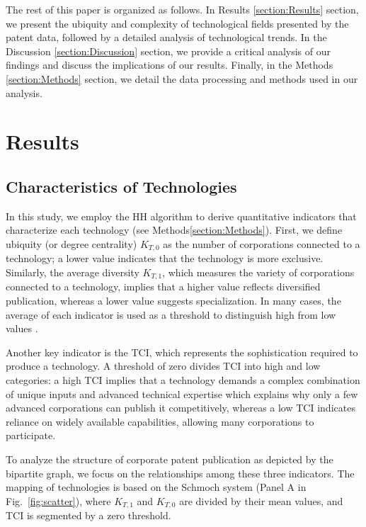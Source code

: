 \documentclass[fleqn,10pt]{wlscirep}
\begin{document}
The rest of this paper is organized as follows. 
In Results \ref{section:Results} section, we present the ubiquity and complexity of technological fields presented by the patent data, followed by a detailed analysis of technological trends.
In the Discussion \ref{section:Discussion} section, we provide a critical analysis of our findings and discuss the implications of our results.
Finally, in the Methods \ref{section:Methods} section, we detail the data processing and methods used in our analysis.


\section*{Results} \label{section:Results}

\subsection*{Characteristics of Technologies} \label{subsection:characteristics}
In this study, we employ the HH algorithm to derive quantitative indicators that characterize each technology (see Methods\ref{section:Methods}). First, we define ubiquity (or degree centrality) $K_{T,0}$ as the number of corporations connected to a technology; a lower value indicates that the technology is more exclusive. Similarly, the average diversity $K_{T,1}$, which measures the variety of corporations connected to a technology, implies that a higher value reflects diversified publication, whereas a lower value suggests specialization. In many cases, the average of each indicator is used as a threshold to distinguish high from low values \cite{Hidalgo2009,balland2017tci}.

Another key indicator is the TCI, which represents the sophistication required to produce a technology. A threshold of zero divides TCI into high and low categories: a high TCI implies that a technology demands a complex combination of unique inputs and advanced technical expertise which explains why only a few advanced corporations can publish it competitively, whereas a low TCI indicates reliance on widely available capabilities, allowing many corporations to participate.

To analyze the structure of corporate patent publication as depicted by the bipartite graph, we focus on the relationships among these three indicators. The mapping of technologies is based on the Schmoch system \cite{Schmoch2008} (Panel A in Fig.~\ref{fig:scatter}), where $K_{T,1}$ and $K_{T,0}$ are divided by their mean values, and TCI is segmented by a zero threshold.
\end{document}
